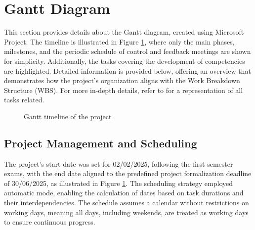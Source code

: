 \section{Gantt Diagram}

This section provides details about the Gantt diagram, created using Microsoft Project. The timeline is illustrated in Figure \ref{fig:gantt_timeline}, where only the main phases, milestones, and the periodic schedule of control and feedback meetings are shown for simplicity. Additionally, the tasks covering the development of competencies are highlighted. Detailed information is provided below, offering an overview that demonstrates how the project’s organization aligns with the Work Breakdown Structure (WBS). For more in-depth details, refer to  for a representation of all tasks related.

\begin{figure}
      \centering
      \caption{Gantt timeline of the project}
      \label{fig:gantt_timeline}
\end{figure}


\subsection{Project Management and Scheduling}

The project’s start date was set for 02/02/2025, following the first semester exams, with the end date aligned to the predefined project formalization deadline of 30/06/2025, as illustrated in Figure \ref{fig:gantt_timeline}. The scheduling strategy employed automatic mode, enabling the calculation of dates based on task durations and their interdependencies. The schedule assumes a calendar without restrictions on working days, meaning all days, including weekends, are treated as working days to ensure continuous progress.

